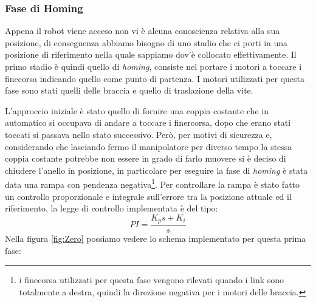 \subsubsection{Fase di Homing}
Appena il robot viene acceso non vi è alcuna conoscienza relativa alla sua posizione, di conseguenza abbiamo bisogno di uno stadio che ci porti in una posizione di riferimento nella quale sappiamo dov'è collocato effettivamente. Il primo stadio è quindi quello di \textit{homing}, consiste nel portare i motori a toccare i finecorsa indicando quello come punto di partenza. I motori utilizzati per questa fase sono stati quelli delle braccia e quello di traslazione della vite.
\par L'approccio iniziale è stato quello di fornire una coppia costante che in automatico si occupava di andare a toccare i finercorsa, dopo che erano stati toccati si passava nello stato successivo. Però, per motivi di sicurezza e, considerando che lasciando fermo il manipolatore per diverso tempo la stessa coppia costante potrebbe non essere in grado di farlo muovere si è deciso di chiudere l'anello in posizione, in particolare per eseguire la fase di \textit{homing} è stata data una rampa con pendenza negativa\footnote{i finecorsa utilizzati per questa fase vengono rilevati quando i link sono totalmente a destra, quindi la direzione negativa per i motori delle braccia.}.
Per controllare la rampa è stato fatto un controllo proporzionale e integrale sull'errore tra la posizione attuale ed il riferimento, la legge di controllo implementata è del tipo:
\begin{equation*}
	PI = \frac{K_p s + K_i}{s}
\end{equation*}
Nella figura \ref{fig:Zero} possiamo vedere lo schema implementato per questa prima fase:
